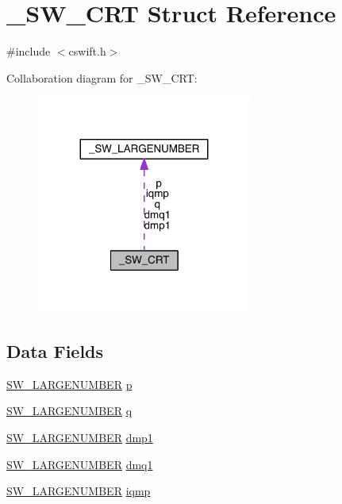 \hypertarget{struct___s_w___c_r_t}{}\section{\+\_\+\+S\+W\+\_\+\+C\+RT Struct Reference}
\label{struct___s_w___c_r_t}


{\ttfamily \#include $<$cswift.\+h$>$}



Collaboration diagram for \+\_\+\+S\+W\+\_\+\+C\+RT\+:\nopagebreak
\begin{figure}[H]
\begin{center}
\leavevmode
\includegraphics[width=200pt]{struct___s_w___c_r_t__coll__graph}
\end{center}
\end{figure}
\subsection*{Data Fields}
\begin{DoxyCompactItemize}
\item 
\hyperlink{cswift_8h_aace52592ab28d0cb89b2ede5e864d859}{S\+W\+\_\+\+L\+A\+R\+G\+E\+N\+U\+M\+B\+ER} \hyperlink{struct___s_w___c_r_t_a60e95aa3174f6d5deec9af8e31301f90}{p}
\item 
\hyperlink{cswift_8h_aace52592ab28d0cb89b2ede5e864d859}{S\+W\+\_\+\+L\+A\+R\+G\+E\+N\+U\+M\+B\+ER} \hyperlink{struct___s_w___c_r_t_a21ddbe8b788924d70fb99345656604bb}{q}
\item 
\hyperlink{cswift_8h_aace52592ab28d0cb89b2ede5e864d859}{S\+W\+\_\+\+L\+A\+R\+G\+E\+N\+U\+M\+B\+ER} \hyperlink{struct___s_w___c_r_t_adbee7cc64121b895262c015e7273ca62}{dmp1}
\item 
\hyperlink{cswift_8h_aace52592ab28d0cb89b2ede5e864d859}{S\+W\+\_\+\+L\+A\+R\+G\+E\+N\+U\+M\+B\+ER} \hyperlink{struct___s_w___c_r_t_a1bbdbbd43817ef0cdb7953d897128f34}{dmq1}
\item 
\hyperlink{cswift_8h_aace52592ab28d0cb89b2ede5e864d859}{S\+W\+\_\+\+L\+A\+R\+G\+E\+N\+U\+M\+B\+ER} \hyperlink{struct___s_w___c_r_t_a8d9c9f6c7dab5d83b3bd3cbdf6caa1da}{iqmp}
\end{DoxyCompactItemize}


